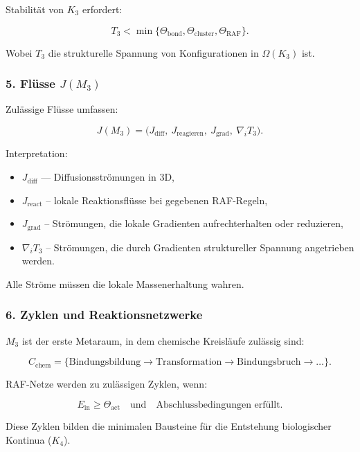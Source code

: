 Stabilität von $K_3$ erfordert:

\[
T_3 < \min\{\Theta_{\mathrm{bond}}, \Theta_{\mathrm{cluster}},
\Theta_{\mathrm{RAF}}\}.
\]

Wobei $T_3$ die strukturelle Spannung von Konfigurationen in $\Omega(K_3)$ ist.

\subsubsection*{5. Flüsse \texorpdfstring{$J(M_3)$}{J(M_3)}}

Zulässige Flüsse umfassen:

\[
J(M_3) =
\big(
J_{\mathrm{diff}},\
J_{\mathrm{reagieren}},\
J_{\mathrm{grad}},\
\nabla_i T_3
\Big).
\]

Interpretation:

\begin{itemize}
    \item $J_{\mathrm{diff}}$ — Diffusionsströmungen in 3D,
    \item $J_{\mathrm{react}}$ – lokale Reaktionsflüsse bei gegebenen RAF-Regeln,
    \item $J_{\mathrm{grad}}$ – Strömungen, die lokale Gradienten aufrechterhalten oder reduzieren,
    \item $\nabla_i T_3$ – Strömungen, die durch Gradienten struktureller Spannung angetrieben werden.
\end{itemize}

Alle Ströme müssen die lokale Massenerhaltung wahren.

\subsubsection*{6. Zyklen und Reaktionsnetzwerke}

$M_3$ ist der erste Metaraum, in dem chemische Kreisläufe zulässig sind:

\[
C_{\mathrm{chem}}
=
\big\{
\text{Bindungsbildung} \to
\text{Transformation} \to
\text{Bindungsbruch}
\to \dots
\Big\}.
\]

RAF-Netze werden zu zulässigen Zyklen, wenn:

\[
E_{\mathrm{in}} \ge \Theta_{\mathrm{act}}
\quad\text{und}\quad
\text{Abschlussbedingungen erfüllt}.
\]

Diese Zyklen bilden die minimalen Bausteine für die Entstehung biologischer Kontinua ($K_4$).

